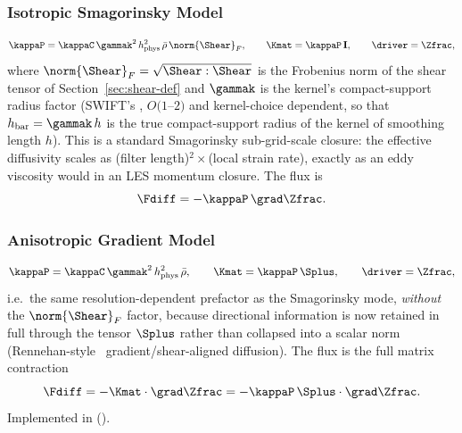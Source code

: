 \subsubsection{Isotropic Smagorinsky Model}
\begin{equation}
  \kappaP = \kappaC \, \gammak^{2} \, h_{\rm phys}^{2} \, \bar\rho \,
            \norm{\Shear}_F , \qquad
  \Kmat = \kappaP \, \mathbf I , \qquad \driver = \Zfrac ,
\end{equation}
where $\norm{\Shear}_F = \sqrt{\Shear:\Shear}$ is the Frobenius norm of
the shear tensor of Section~\ref{sec:shear-def} and $\gammak$ is the
kernel's compact-support radius factor (SWIFT's ,
$O(1$--$2)$ and kernel-choice dependent, so that
$h_{\rm bar} = \gammak\, h$ is the true compact-support radius of the
kernel of smoothing length $h$). This is a standard Smagorinsky
sub-grid-scale closure: the effective diffusivity scales as
(filter length)$^2\times$(local strain rate), exactly as an eddy
viscosity would in an LES momentum closure. The flux is
\begin{equation}
  \Fdiff = -\kappaP \,\grad \Zfrac .
\end{equation}

\subsubsection{Anisotropic Gradient Model}
\begin{equation}
  \kappaP = \kappaC \, \gammak^{2} \, h_{\rm phys}^{2} \, \bar\rho , \qquad
  \Kmat = \kappaP \, \Splus , \qquad \driver = \Zfrac ,
\end{equation}
i.e.\ the same resolution-dependent prefactor as the Smagorinsky mode,
\emph{without} the $\norm{\Shear}_F$ factor, because directional
information is now retained in full through the tensor $\Splus$ rather
than collapsed into a scalar norm (Rennehan-style~\cite{Rennehan2021} gradient/shear-aligned
diffusion). The flux is the full matrix contraction
\begin{equation}
  \Fdiff = -\Kmat \cdot \grad \Zfrac
         = -\kappaP\, \Splus \cdot \grad \Zfrac .
\end{equation}
Implemented in 
().

